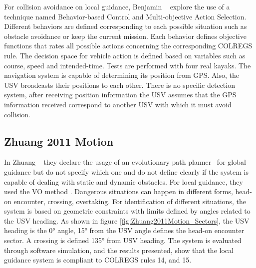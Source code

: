     
    For collision avoidance on local guidance, Benjamin \etal~\cite{Benjamin2004COLREGS} explore the use of a technique named Behavior-based Control and Multi-objective Action Selection. Different behaviors are defined corresponding to each possible situation such as obstacle avoidance or keep the current mission. Each behavior defines objective functions that rates all possible actions concerning the corresponding \ac{COLREGS} rule. The decision space for vehicle action is defined based on variables such as course, speed and intended-time. Tests are performed with four real kayaks. The navigation system is capable of determining its position from \ac{GPS}. Also, the \ac{USV} broadcasts their positions to each other. There is no specific detection system, after receiving position information the \ac{USV} assumes that the \ac{GPS} information received correspond to another \ac{USV} with which it must avoid collision.
    
    \subsection{Zhuang 2011 Motion}
    In Zhuang \etal~\cite{Zhuang2011Motion} they declare the usage of an evolutionary path planner~\cite{Russel2003AI_GA} for global guidance but do not specify which one and do not define clearly if the system is capable of dealing with static and dynamic obstacles. For local guidance, they used the \ac{VO} method \cite{Fiorini1998Motion}. Dangerous situations can happen in different forms, head-on encounter, crossing, overtaking. For identification of different situations, the system is based on geometric constraints with limits defined by angles related to the \ac{USV} heading. As shown in figure \ref{fig:Zhuang2011Motion_Sectors}, the \ac{USV} heading is the 0° angle, 15° from the \ac{USV} angle defines the head-on encounter sector. A crossing is defined 135° from \ac{USV} heading. The system is evaluated through software simulation, and the results presented, show that the local guidance system is compliant to \ac{COLREGS} rules 14, and 15.
    
